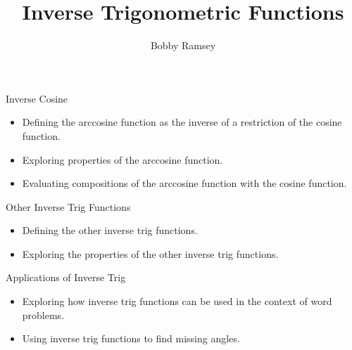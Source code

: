 \documentclass{ximera}
\author{Bobby Ramsey}
\title{Inverse Trigonometric Functions}
\begin{document}
\begin{abstract}
\end{abstract}
\maketitle


\begin{objectives}
	\item Inverse Cosine
		\begin{itemize}
			\item Defining the arccosine function as the inverse of a restriction of the cosine function.
			\item Exploring properties of the arccosine function.
			\item Evaluating compositions of the arccosine function with the cosine function. 
		\end{itemize}
	
	\item Other Inverse Trig Functions
		\begin{itemize}
			\item Defining the other inverse trig functions. 
			\item Exploring the properties of the other inverse trig functions. 
		\end{itemize}

	\item Applications of Inverse Trig
		\begin{itemize}
			\item Exploring how inverse trig functions can be used in the context of word problems. 
			\item Using inverse trig functions to find missing angles. 
		\end{itemize}
\end{objectives}
\end{document}
